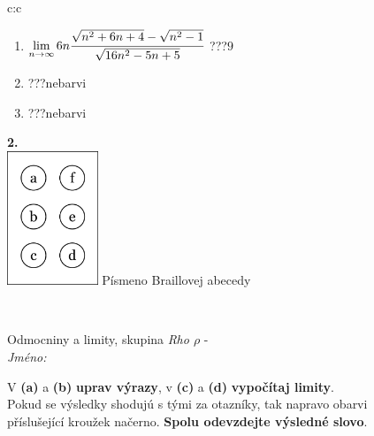\documentclass[10pt]{report}
\begin{document}
\begin{tabular}{c:c}
\begin{minipage}[c][104.5mm][t]{0.5\linewidth}
\begin{center}
\begin{minipage}{0.79\linewidth}
\begin{center}
\begin{varwidth}{\linewidth}
\begin{enumerate}
\item $\lim\limits_{n\to\infty}6n\cfrac{\sqrt{n^2+6n+4}-\sqrt{n^2-1}}{\sqrt{16n^2-5n+5}}$\quad \dotfill\; ???\;\dotfill \quad $9$
\item \quad \dotfill\; ???\;\dotfill \quad nebarvi
\item \quad \dotfill\; ???\;\dotfill \quad nebarvi
\end{enumerate}
\end{varwidth}
\end{center}
\end{minipage}
\begin{minipage}{0.20\linewidth}
\begin{center}
{\Huge\bfseries 2.} \\[2mm]
\includegraphics[height=40mm]{../images/braille.png}
{\small Písmeno Braillovej abecedy}
\end{center}
\end{minipage}
\end{center}
\end{minipage}
\\ \hdashline
\begin{minipage}[c][104.5mm][t]{0.5\linewidth}
\begin{center}
\vspace{7mm}
{\huge Odmocniny a limity, skupina \textit{Rho $\rho$} -}\\[5mm]
\textit{Jméno:}\phantom{xxxxxxxxxxxxxxxxxxxxxxxxxxxxxxxxxxxxxxxxxxxxxxxxxxxxxxxxxxxxxxxxx}\\[5mm]
\begin{minipage}{0.95\linewidth}
\begin{center}
V \textbf{(a)} a \textbf{(b)} \textbf{uprav výrazy}, v \textbf{(c)} a \textbf{(d)} \textbf{vypočítaj limity}.\\Pokud se výsledky shodujú s tými za otazníky, tak napravo obarvi\\příslušející kroužek načerno. \textbf{Spolu odevzdejte výsledné slovo}.
\end{center}
\end{minipage}
\\[1mm]

\end{center}
\end{minipage}
\end{tabular}
\end{document}
